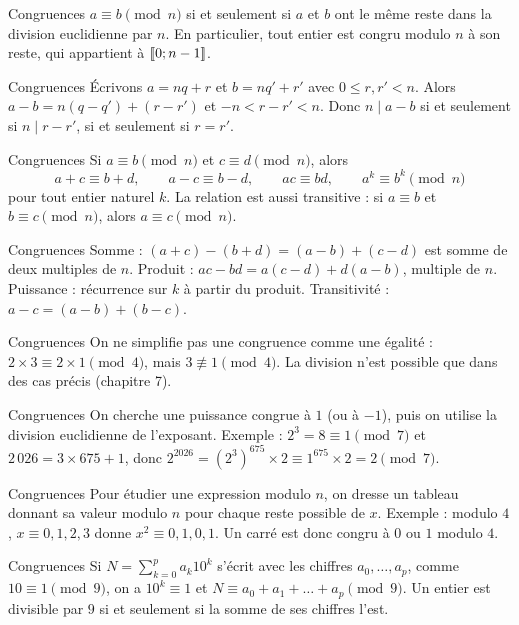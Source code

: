 \documentclass[aspectratio=169,10pt]{beamer}
\providecommand{\llbracket}{\mathopen{[\mkern-3mu[}}
\providecommand{\rrbracket}{\mathclose{]\mkern-3mu]}}
\begin{document}
\begin{frame}{Congruences}
\(a\equiv b\pmod n\) si et seulement si \(a\) et \(b\) ont le même reste dans la division euclidienne par \(n\). En particulier, tout entier est congru modulo \(n\) à son reste, qui appartient à \(\llbracket 0;n-1\rrbracket\).
\end{frame}
\begin{frame}{Congruences}
Écrivons \(a=nq+r\) et \(b=nq'+r'\) avec \(0\le r,r'<n\). Alors \(a-b=n(q-q')+(r-r')\) et \(-n<r-r'<n\). Donc \(n\mid a-b\) si et seulement si \(n\mid r-r'\), si et seulement si \(r=r'\).
\end{frame}
\begin{frame}{Congruences}
Si \(a\equiv b\pmod n\) et \(c\equiv d\pmod n\), alors
\[a+c\equiv b+d,\qquad a-c\equiv b-d,\qquad ac\equiv bd,\qquad a^k\equiv b^k\pmod n\]
pour tout entier naturel \(k\). La relation est aussi transitive : si \(a\equiv b\) et \(b\equiv c\pmod n\), alors \(a\equiv c\pmod n\).
\end{frame}
\begin{frame}{Congruences}
Somme : \((a+c)-(b+d)=(a-b)+(c-d)\) est somme de deux multiples de \(n\). Produit : \(ac-bd=a(c-d)+d(a-b)\), multiple de \(n\). Puissance : récurrence sur \(k\) à partir du produit. Transitivité : \(a-c=(a-b)+(b-c)\).
\end{frame}
\begin{frame}{Congruences}
On ne simplifie pas une congruence comme une égalité : \(2\times3\equiv2\times1\pmod4\), mais \(3\not\equiv1\pmod4\). La division n'est possible que dans des cas précis (chapitre 7).
\end{frame}
\begin{frame}{Congruences}
On cherche une puissance congrue à \(1\) (ou à \(-1\)), puis on utilise la division euclidienne de l'exposant. Exemple : \(2^3=8\equiv1\pmod7\) et \(2\,026=3\times675+1\), donc \(2^{2026}=\left(2^3\right)^{675}\times2\equiv1^{675}\times2=2\pmod7\).
\end{frame}
\begin{frame}{Congruences}
Pour étudier une expression modulo \(n\), on dresse un tableau donnant sa valeur modulo \(n\) pour chaque reste possible de \(x\). Exemple : modulo \(4\), \(x\equiv0,1,2,3\) donne \(x^2\equiv0,1,0,1\). Un carré est donc congru à \(0\) ou \(1\) modulo \(4\).
\end{frame}
\begin{frame}{Congruences}
Si \(N=\sum_{k=0}^{p}a_k10^k\) s'écrit avec les chiffres \(a_0,\dots,a_p\), comme \(10\equiv1\pmod9\), on a \(10^k\equiv1\) et \(N\equiv a_0+a_1+\dots+a_p\pmod9\). Un entier est divisible par \(9\) si et seulement si la somme de ses chiffres l'est.
\end{frame}
\end{document}
